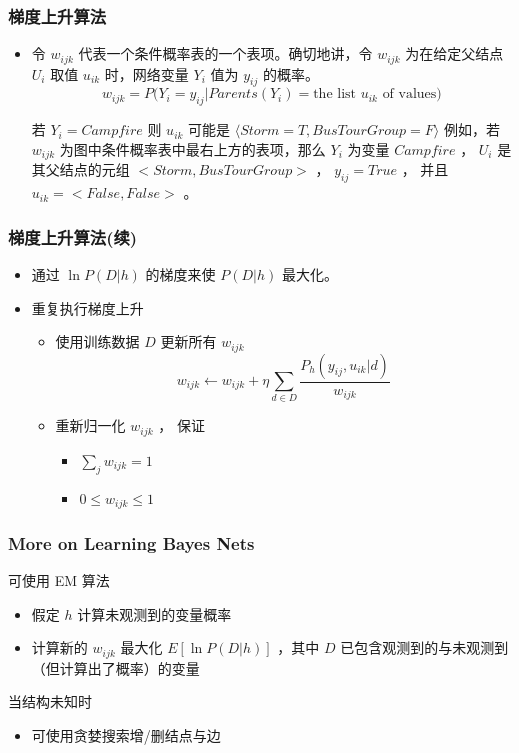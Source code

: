 \documentclass{beamer}
\begin{document}
\begin{frame}
\frametitle{梯度上升算法}
\label{sec-8-9}


\begin{itemize}
\item 令 $w_{ijk}$ 代表一个条件概率表的一个表项。确切地讲，令 $w_{ijk}$  为在给定父结点 $U_i$ 取值 $u_{ik}$ 时，网络变量 $Y_i$ 值为 $y_{ij}$ 的概率。
    $$w_{ijk} = P(Y_i=y_{ij} | Parents(Y_i) = \mbox{the list $u_{ik}$ of values)}$$

    若  $Y_i = Campfire$ 则 $u_{ik}$ 可能是 $\langle Storm=T, BusTourGroup=F \rangle$
    例如，若 $w_{ijk}$ 为图中条件概率表中最右上方的表项，那么 $Y_i$ 为变量 $Campfire$ ， 
    $U_i$ 是其父结点的元组 $<Storm, BusTourGroup>$ ， $y_{ij}=True$ ， 并且 $u_{ik}=<False, False>$ 。
\end{itemize}
\end{frame}
\begin{frame}
\frametitle{梯度上升算法(续)}
\label{sec-8-10}

\begin{itemize}
\item 通过 $\ln P(D|h)$ 的梯度来使 $P(D|h)$ 最大化。
\item 重复执行梯度上升
\begin{itemize}
\item 使用训练数据 $D$ 更新所有 $w_{ijk}$ 
    $$w_{ijk} \leftarrow w_{ijk} + \eta \sum_{d \in D} \frac{P_h(y_{ij}, u_{ik} |d)}{w_{ijk}}$$
\item 重新归一化 $w_{ijk}$ ， 保证
\begin{itemize}
\item $\sum_{j} w_{ijk} = 1$
\item $0 \leq w_{ijk} \leq 1$
\end{itemize}
\end{itemize}
\end{itemize}
\end{frame}
\begin{frame}
\frametitle{More on Learning Bayes Nets}
\label{sec-8-11}


可使用 EM 算法
\begin{itemize}
\item 假定 $h$ 计算未观测到的变量概率
\item 计算新的 $w_{ijk}$ 最大化 $E[\ln P(D|h)]$ ，其中 $D$ 已包含观测到的与未观测到（但计算出了概率）的变量
\end{itemize}

当结构未知时
\begin{itemize}
\item 可使用贪婪搜索增/删结点与边
\end{itemize}
\end{frame}
\end{document}

